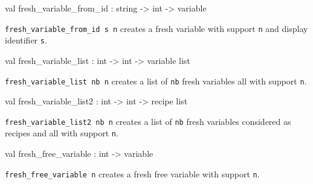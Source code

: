\label{val:Recipe.fresh-underscorevariable-underscorefrom-underscoreid}\begin{ocamldoccode}
val fresh_variable_from_id : string -> int -> variable
\end{ocamldoccode}
\begin{ocamldocdescription}
{\tt{fresh\_variable\_from\_id s n}} creates a fresh variable with support {\tt{n}} and display identifier {\tt{s}}.


\end{ocamldocdescription}




\label{val:Recipe.fresh-underscorevariable-underscorelist}\begin{ocamldoccode}
val fresh_variable_list : int -> int -> variable list
\end{ocamldoccode}
\begin{ocamldocdescription}
{\tt{fresh\_variable\_list nb n}} creates a list of {\tt{nb}} fresh variables all with support {\tt{n}}.


\end{ocamldocdescription}




\label{val:Recipe.fresh-underscorevariable-underscorelist2}\begin{ocamldoccode}
val fresh_variable_list2 : int -> int -> recipe list
\end{ocamldoccode}
\begin{ocamldocdescription}
{\tt{fresh\_variable\_list2 nb n}} creates a list of {\tt{nb}} fresh variables considered as recipes and all with support {\tt{n}}.


\end{ocamldocdescription}




\label{val:Recipe.fresh-underscorefree-underscorevariable}\begin{ocamldoccode}
val fresh_free_variable : int -> variable
\end{ocamldoccode}
\begin{ocamldocdescription}
{\tt{fresh\_free\_variable n}} creates a fresh free variable with support {\tt{n}}.


\end{ocamldocdescription}





